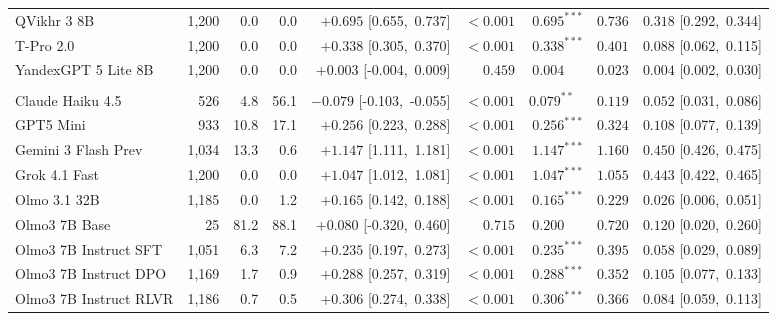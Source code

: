 \begin{table}[t]
{\begin{tabular}{l r r r r r r r r}
QVikhr 3 8B & 1,200 & 0.0 & 0.0 & $+0.695$ [0.655,\ 0.737] & $<\!0.001$ & $0.695^{***}$ & $0.736$ & $0.318$ [0.292,\ 0.344] \\
T-Pro 2.0 & 1,200 & 0.0 & 0.0 & $+0.338$ [0.305,\ 0.370] & $<\!0.001$ & $0.338^{***}$ & $0.401$ & $0.088$ [0.062,\ 0.115] \\
YandexGPT 5 Lite 8B & 1,200 & 0.0 & 0.0 & $+0.003$ [-0.004,\ 0.009] & $0.459$ & $0.004^{\phantom{***}}$ & $0.023$ & $0.004$ [0.002,\ 0.030] \\
\midrule
\addlinespace[3pt]
\multicolumn{9}{l}{\textit{\small USA}}\\
\addlinespace[1pt]
Claude Haiku 4.5 & 526 & 4.8 & 56.1 & $-0.079$ [-0.103,\ -0.055] & $<\!0.001$ & $0.079^{**\phantom{*}}$ & $0.119$ & $0.052$ [0.031,\ 0.086] \\
GPT5 Mini & 933 & 10.8 & 17.1 & $+0.256$ [0.223,\ 0.288] & $<\!0.001$ & $0.256^{***}$ & $0.324$ & $0.108$ [0.077,\ 0.139] \\
Gemini 3 Flash Prev & 1,034 & 13.3 & 0.6 & $+1.147$ [1.111,\ 1.181] & $<\!0.001$ & $1.147^{***}$ & $1.160$ & $0.450$ [0.426,\ 0.475] \\
Grok 4.1 Fast & 1,200 & 0.0 & 0.0 & $+1.047$ [1.012,\ 1.081] & $<\!0.001$ & $1.047^{***}$ & $1.055$ & $0.443$ [0.422,\ 0.465] \\
Olmo 3.1 32B & 1,185 & 0.0 & 1.2 & $+0.165$ [0.142,\ 0.188] & $<\!0.001$ & $0.165^{***}$ & $0.229$ & $0.026$ [0.006,\ 0.051] \\
Olmo3 7B Base & 25 & 81.2 & 88.1 & $+0.080$ [-0.320,\ 0.460] & $0.715$ & $0.200^{\phantom{***}}$ & $0.720$ & $0.120$ [0.020,\ 0.260] \\
Olmo3 7B Instruct SFT & 1,051 & 6.3 & 7.2 & $+0.235$ [0.197,\ 0.273] & $<\!0.001$ & $0.235^{***}$ & $0.395$ & $0.058$ [0.029,\ 0.089] \\
Olmo3 7B Instruct DPO & 1,169 & 1.7 & 0.9 & $+0.288$ [0.257,\ 0.319] & $<\!0.001$ & $0.288^{***}$ & $0.352$ & $0.105$ [0.077,\ 0.133] \\
Olmo3 7B Instruct RLVR & 1,186 & 0.7 & 0.5 & $+0.306$ [0.274,\ 0.338] & $<\!0.001$ & $0.306^{***}$ & $0.366$ & $0.084$ [0.059,\ 0.113] \\
\bottomrule
\end{tabular}%
}
\end{table}